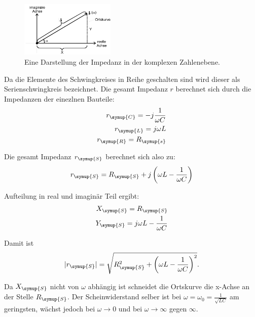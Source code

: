     \begin{figure}[H]
        \centering
        \includegraphics[width=0.4\textwidth]{images/Imaginaer.PNG}
        \caption{Eine Darstellung der Impedanz in der komplexen Zahlenebene\protect \cite{V354}.}
        \label{img:imag}
    \end{figure}

    \noindent Da die Elemente des Schwingkreises in Reihe geschalten sind wird dieser als Serienschwingkreis bezeichnet. Die gesamt Impedanz $r$ berechnet 
    sich durch die Impedanzen der einezlnen Bauteile:
    \begin{align}
        r_{\symup{C}} = -j\frac{1}{\omega C} \nonumber\\
        r_{\symup{L}} = j\omega L  \nonumber\\
        r_{\symup{R}} = R_{\symup{s}} \nonumber
    \end{align}

    \noindent Die gesamt Impedanz $r_{\symup{S}}$ berechnet sich also zu:
    \begin{equation}
        r_{\symup{S}} = R_{\symup{S}} + j \left(    \omega L - \frac{1}{\omega C} \right) \nonumber
    \end{equation}

    \noindent Aufteilung in real und imaginär Teil ergibt:
    \begin{align}
        X_{\symup{S}} = R_{\symup{S}}  \nonumber\\ 
        Y_{\symup{S}} = j \omega L - \frac{1}{\omega C} \nonumber
    \end{align}

    \noindent Damit ist
    \begin{equation}
        |r_{\symup{S}}| = \sqrt{R^2_{\symup{S}} + \left( \omega L - \frac{1}{\omega C} \right)^2} . \nonumber
    \end{equation}

    \noindent Da $X_{\symup{S}}$ nicht von $\omega$ abhängig ist schneidet die Ortskurve die x-Achse an der Stelle $R_{\symup{S}}$. Der Scheinwiderstand 
    selber ist bei $\omega = \omega_0 = \frac{1}{\sqrt{LC}}$ am geringsten, wächst jedoch bei $\omega \to 0$ und bei $\omega \to \infty$ 
    gegen $\infty$.


